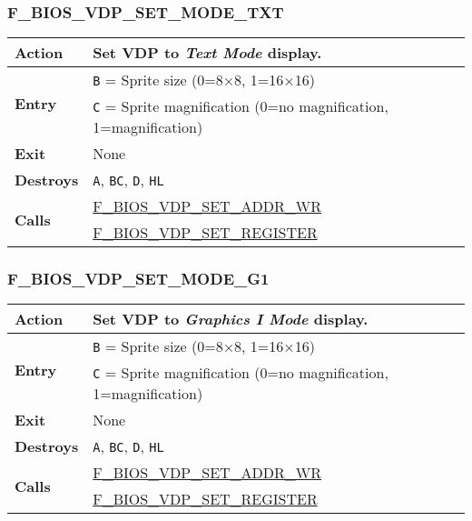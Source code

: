         \subsubsection{F\_BIOS\_VDP\_SET\_MODE\_TXT}
        \label{func:fbiosvdpsetmodetxt}
        \begin{tabular}{l p{9cm}}
            \hline\textbf{Action}
            & Set \textbf{VDP} to \textit{Text Mode} display.\\
            \hline\multirow[t]{2}{4em}{\textbf{Entry}}
            & \texttt{B} = Sprite size (0=8×8, 1=16×16)\\
            & \texttt{C} = Sprite magnification (0=no magnification,
                1=magnification)\\
            \hline\textbf{Exit} & None\\
            \hline\textbf{Destroys} & \texttt{A}, \texttt{BC}, \texttt{D},
            \texttt{HL} \\
            \hline\multirow[t]{2}{4em}{\textbf{Calls}}
            & \hyperref[func:fbiosvdpsetaddrwr]{F\_BIOS\_VDP\_SET\_ADDR\_WR}\\
            & \hyperref[func:fbiosvdpsetregister]{F\_BIOS\_VDP\_SET\_REGISTER}\\
            \hline
        \end{tabular}

        \subsubsection{F\_BIOS\_VDP\_SET\_MODE\_G1}
        \label{func:fbiosvdpsetmodeg1}
        \begin{tabular}{l p{9cm}}
            \hline\textbf{Action}
            & Set \textbf{VDP} to \textit{Graphics I Mode} display.\\
            \hline\multirow[t]{2}{4em}{\textbf{Entry}}
            & \texttt{B} = Sprite size (0=8×8, 1=16×16)\\
            & \texttt{C} = Sprite magnification (0=no magnification,
                1=magnification)\\
            \hline\textbf{Exit} & None\\
            \hline\textbf{Destroys} & \texttt{A}, \texttt{BC}, \texttt{D},
            \texttt{HL} \\
            \hline\multirow[t]{2}{4em}{\textbf{Calls}}
            & \hyperref[func:fbiosvdpsetaddrwr]{F\_BIOS\_VDP\_SET\_ADDR\_WR}\\
            & \hyperref[func:fbiosvdpsetregister]{F\_BIOS\_VDP\_SET\_REGISTER}\\
            \hline
        \end{tabular}

